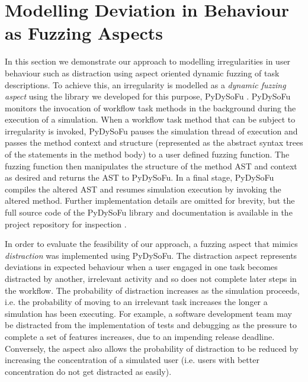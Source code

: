 \documentclass{llncs}
\begin{document}

\section{Modelling Deviation in Behaviour as Fuzzing Aspects}
\label{sec:fuzzing}


In this section we demonstrate our approach to modelling irregularities in user behaviour such as distraction using
aspect oriented dynamic fuzzing of task descriptions.  To achieve this, an irregularity is modelled as a \emph{dynamic
  fuzzing aspect} using the library we developed for this purpose, PyDySoFu \cite{storer2016pydysofu-scm}.  PyDySoFu
monitors the invocation of workflow task methods in the background during the execution of a simulation.  When a
workflow task method that can be subject to irregularity is invoked, PyDySoFu pauses the simulation thread of execution
and passes the method context and structure (represented as the abstract syntax trees of the statements in the method
body) to a user defined fuzzing function.  The fuzzing function then manipulates the structure of the method AST and
context as desired and returns the AST to PyDySoFu.  In a final stage, PyDySoFu compiles the altered AST and resumes
simulation execution by invoking the altered method.  Further implementation details are omitted for brevity, but the
full source code of the PyDySoFu library and documentation is available in the project repository for inspection
\cite{storer2016pydysofu-scm}.

In order to evaluate the feasibility of our approach, a fuzzing aspect that mimics \emph{distraction} was implemented
using PyDySoFu.  The distraction aspect represents deviations in expected behaviour when a user engaged in one task
becomes distracted by another, irrelevant activity and so does not complete later steps in the workflow.  The
probability of distraction increases as the simulation proceeds, i.e. the probability of moving to an irrelevant task
increases the longer a simulation has been executing.  For example, a software development team may be distracted from
the implementation of tests and debugging as the pressure to complete a set of features increases, due to an impending
release deadline.  Conversely, the aspect also allows the probability of distraction to be reduced by increasing the
concentration of a simulated user (i.e. users with better concentration do not get distracted as easily).
\end{document}
